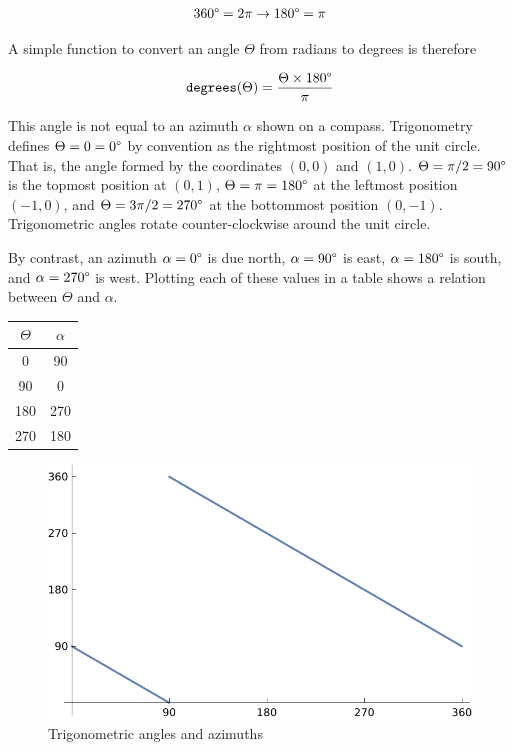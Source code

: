 \documentclass{book}
\begin{document}
\begin{equation}
360\degree = 2\pi \to 180\degree = \pi
\end{equation}

A simple function to convert an angle $\Theta$ from radians to degrees is therefore

\begin{equation}
\texttt{degrees}(\Theta) = \frac{\Theta \times 180\degree}{\pi}
\end{equation}

This angle is not equal to an azimuth $\alpha$ shown on a compass. Trigonometry defines $\Theta=0=0\degree$ by convention as the rightmost position of the unit circle. That is, the angle formed by the coordinates $(0,0)$ and $(1,0)$. $\Theta = \pi/2 = 90\degree$ is the topmost position at $(0,1)$, $\Theta = \pi = 180\degree$ at the leftmost position $(-1,0)$, and $\Theta = {3\pi}/2 = 270\degree$ at the bottommost position $(0,-1)$. Trigonometric angles rotate counter-clockwise around the unit circle.

By contrast, an azimuth $\alpha = 0\degree$ is due north, $\alpha = 90\degree$ is east, $\alpha = 180\degree$ is south, and $\alpha = 270\degree$ is west. Plotting each of these values in a table shows a relation between $\Theta$ and $\alpha$.

\begin{center}
\begin{tabular}{c | c}
$\Theta$ & $\alpha$ \\
\hline
0 & 90 \\
90 & 0 \\
180 & 270 \\
270 & 180 \\
\end{tabular}
\end{center}

\begin{figure}[H]
\centering
\includegraphics[width=.75\textwidth,keepaspectratio]{figures/azimuth}
\caption{Trigonometric angles and azimuths}
\end{figure}
\end{document}
